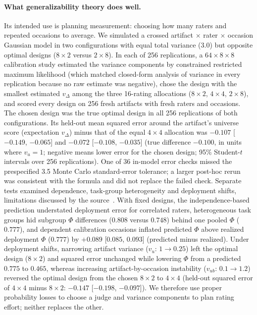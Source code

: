 \paragraph{What generalizability theory does well.}
Its intended use is planning measurement: choosing how many raters and repeated occasions to average.
We simulated a crossed artifact $\times$ rater $\times$ occasion Gaussian model in two configurations with equal total variance ($3.0$) but opposite optimal designs ($8\times 2$ versus $2\times 8$).
In each of 256 replications, a $64\times 8\times 8$ calibration study estimated the variance components by constrained restricted maximum likelihood (which matched closed-form analysis of variance in every replication because no raw estimate was negative), chose the design with the smallest estimated $v_\Delta$ among the three 16-rating allocations ($8\times 2$, $4\times 4$, $2\times 8$), and scored every design on 256 fresh artifacts with fresh raters and occasions.
The chosen design was the true optimal design in all 256 replications of both configurations.
Its held-out mean squared error around the artifact's universe score (expectation $v_\Delta$) minus that of the equal $4\times 4$ allocation was $-0.107$ [$-0.149$, $-0.065$] and $-0.072$ [$-0.108$, $-0.035$] (true difference $-0.100$, in units where $v_u=1$; negative means lower error for the chosen design; 95\% Student-$t$ intervals over 256 replications).
One of 36 in-model error checks missed the prespecified 3.5 Monte Carlo standard-error tolerance; a larger post-hoc rerun was consistent with the formula and did not replace the failed check.
Separate tests examined dependence, task-group heterogeneity and deployment shifts, limitations discussed by the source~\citep{shavelson1989generalizability}.
With fixed designs, the independence-based prediction understated deployment error for correlated raters, heterogeneous task groups hid subgroup $\Phi$ differences ($0.808$ versus $0.748$) behind one pooled $\Phi$ ($0.777$), and dependent calibration occasions inflated predicted $\Phi$ above realized deployment $\Phi$ ($0.777$) by $+0.089$ [$0.085$, $0.093$] (predicted minus realized).
Under deployment shifts, narrowing artifact variance ($v_u$: $1\to 0.25$) left the optimal design ($8\times 2$) and squared error unchanged while lowering $\Phi$ from a predicted $0.775$ to $0.465$, whereas increasing artifact-by-occasion instability ($v_{ub}$: $0.1\to 1.2$) reversed the optimal design from the chosen $8\times 2$ to $4\times 4$ (held-out squared error of $4\times 4$ minus $8\times 2$: $-0.147$ [$-0.198$, $-0.097$]).
We therefore use proper probability losses to choose a judge and variance components to plan rating effort; neither replaces the other.
